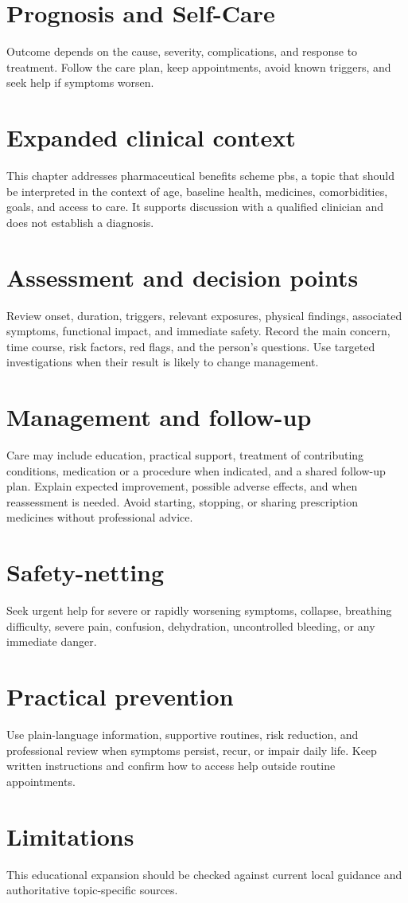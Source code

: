 \section*{Prognosis and Self-Care}
Outcome depends on the cause, severity, complications, and response to treatment. Follow the care plan, keep appointments, avoid known triggers, and seek help if symptoms worsen.

\section*{Expanded clinical context}
This chapter addresses pharmaceutical benefits scheme pbs, a topic that should be interpreted in the context of age, baseline health, medicines, comorbidities, goals, and access to care. It supports discussion with a qualified clinician and does not establish a diagnosis.

\section*{Assessment and decision points}
Review onset, duration, triggers, relevant exposures, physical findings, associated symptoms, functional impact, and immediate safety. Record the main concern, time course, risk factors, red flags, and the person’s questions. Use targeted investigations when their result is likely to change management.

\section*{Management and follow-up}
Care may include education, practical support, treatment of contributing conditions, medication or a procedure when indicated, and a shared follow-up plan. Explain expected improvement, possible adverse effects, and when reassessment is needed. Avoid starting, stopping, or sharing prescription medicines without professional advice.

\section*{Safety-netting}
Seek urgent help for severe or rapidly worsening symptoms, collapse, breathing difficulty, severe pain, confusion, dehydration, uncontrolled bleeding, or any immediate danger.

\section*{Practical prevention}
Use plain-language information, supportive routines, risk reduction, and professional review when symptoms persist, recur, or impair daily life. Keep written instructions and confirm how to access help outside routine appointments.

\section*{Limitations}
This educational expansion should be checked against current local guidance and authoritative topic-specific sources.
\clearpage
